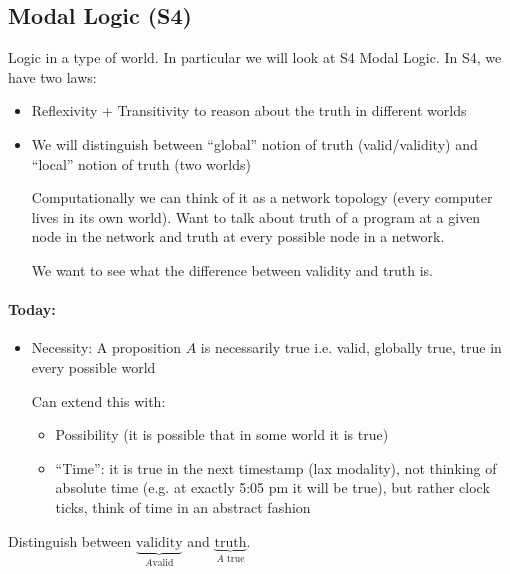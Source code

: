 \documentclass[12 pt]{article}
\begin{document}
       \subsection{Modal Logic (S4)} Logic in a type of world. In
       particular we will look at S4 Modal Logic. In S4, we have two
       laws:
       \begin{itemize}
       \item Reflexivity + Transitivity to reason about the truth in
         different worlds
       \item We will distinguish between ``global'' notion of truth
         (valid/validity) and ``local'' notion of truth (two worlds)

         Computationally we can think of it as a network topology
         (every computer lives in its own world). Want to talk about
         truth of a program at a given node in the network and truth
         at every possible node in a network.

         We want to see what the difference between validity and truth is.
       \end{itemize}
       \paragraph{Today:}
       \begin{itemize}
       \item Necessity: A proposition $A$ is necessarily true
         i.e. valid, globally true, true in every possible world

         Can extend this with:
         \begin{itemize}
         \item Possibility (it is possible that in some world it is
           true)
         \item ``Time'': it is true in the next timestamp (lax
           modality), not thinking of absolute time (e.g. at exactly
           5:05 pm it will be true), but rather clock ticks, think of
           time in an abstract fashion
         \end{itemize}
       \end{itemize}
       Distinguish between $\underbrace{\text{validity}}_{A\text{
           valid}}$ and $\underbrace{\text{truth}}_{A\text{ true}}$.
\end{document}
